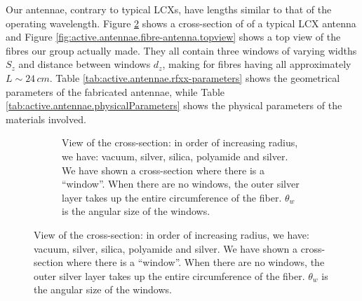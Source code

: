Our antennae, contrary to typical LCXs, have lengths similar to that of the operating
wavelength. Figure \ref{fig:active.antennae.fibre-antenna.xsection} shows a cross-section of
of a typical LCX antenna and Figure \ref{fig:active.antennae.fibre-antenna.topview} shows
a top view of the fibres our group actually made. They all contain three windows of varying
widths $S_z$ and distance between windows $d_z$, making for fibres having all approximately
$L\sim24\,\unit{cm}$. Table \ref{tab:active.antennae.rfxx-parameters} shows the geometrical parameters
of the fabricated antennae, while Table \ref{tab:active.antennae.physicalParameters} shows the 
physical parameters of the materials involved. 

\begin{figure}
  \centering
  \begin{subfigure}[b]{\textwidth}
    \centering
   \vspace{0.25cm}
   \caption{View of the cross-section: in order of increasing radius, we have: vacuum, silver, silica, polyamide and silver.
	    We have shown a cross-section where there is a ``window''. When there are no windows, 
	    the outer silver layer takes up the entire circumference of the fiber.
	    $\theta_w$ is the angular size of the windows.}
   \label{fig:active.antennae.fibre-antenna.xsection}
  \end{subfigure}
  

\end{figure}
